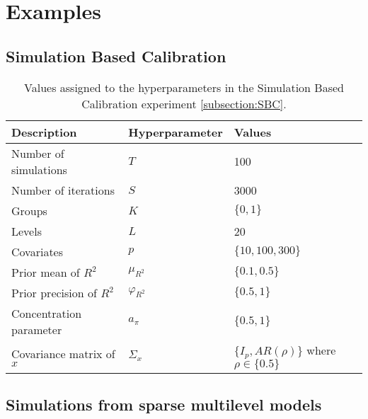 
\section{Examples}
\label{section:appendixC}

\subsection{Simulation Based Calibration}

\begin{table}[ht]
\centering
\begin{tabular}{l|l|l}
Description & Hyperparameter  & {Values}                                      \\ \hline
Number of simulations & $T$ & 100 \\
Number of iterations  & $S$ & 3000 \\
Groups  & $K$             & $\{0,1\}$                                         \\
Levels & $L$             & 20                                                \\
Covariates & $p$             & $\{10,100,300\}$                                  \\
Prior mean of $R^2$ &$\mu_{R^2}$     & $\{0.1,0.5\}$                                 \\
Prior precision of $R^2$& $\varphi_{R^2}$ & $\{0.5,1\}$                                     \\
Concentration parameter & $a_\pi$         & \textbf{$\{0.5,1\}$}                          \\
Covariance matrix of $x$ & $\Sigma_x$      & $\{I_p, AR(\rho) \}$ where $\rho \in \{0.5\}$ \\
\end{tabular}
\caption{Values assigned to the hyperparameters in the Simulation Based Calibration experiment \ref{subsection:SBC}.}
\label{tab:sbchyperparams}
\end{table}


\subsection{Simulations from sparse multilevel models}


